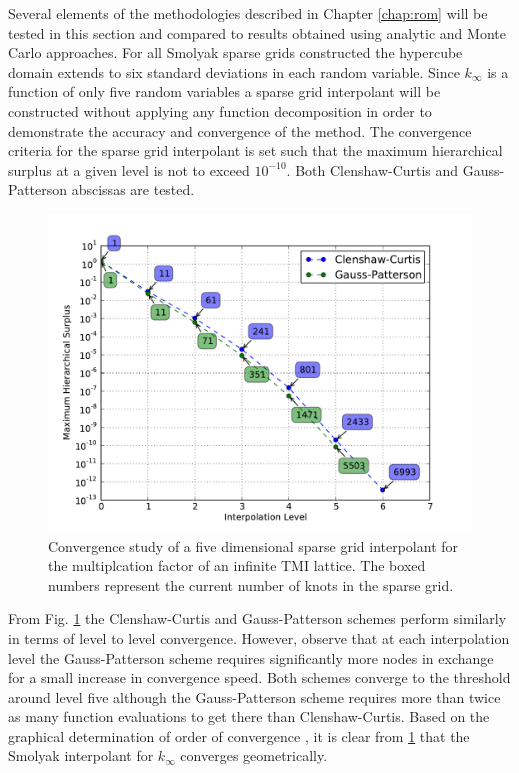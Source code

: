 Several elements of the methodologies described in Chapter \ref{chap:rom} will be tested in this section and compared to results obtained using analytic and Monte Carlo approaches. For all Smolyak sparse grids constructed the hypercube domain extends to six standard deviations in each random variable. Since $k_{\infty}$ is a function of only five random variables a sparse grid interpolant will be constructed without applying any function decomposition in order to demonstrate the accuracy and convergence of the method. The convergence criteria for the sparse grid interpolant is set such that the maximum hierarchical surplus at a given level is not to exceed $10^{-10}$. Both Clenshaw-Curtis and Gauss-Patterson abscissas are tested. 
\begin{figure}
\caption{ \label{fig:kinf_sg_convergence}
Convergence study of a five dimensional sparse grid interpolant for the  multiplcation factor of an infinite TMI lattice. The boxed numbers represent the current number of knots in the sparse grid.}
 \begin{center}
  \includegraphics[scale=.75]{./Chapter3/kinf_sparse_grid_convergence.pdf}
 \end{center}
\end{figure}

From Fig. \ref{fig:kinf_sg_convergence} the Clenshaw-Curtis and Gauss-Patterson schemes perform similarly in terms of level to level convergence. However, observe that at each interpolation level the Gauss-Patterson scheme requires significantly more nodes in exchange for a small increase in convergence speed. Both schemes converge to the threshold around level five although the Gauss-Patterson scheme requires more than twice as many function evaluations to get there than Clenshaw-Curtis. Based on the graphical determination of order of convergence \cite{Boyd}, it is clear from \ref{fig:kinf_sg_convergence} that the Smolyak interpolant for $k_{\infty}$ converges geometrically.

